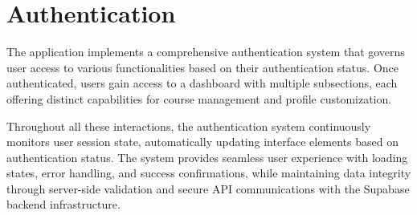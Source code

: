 \section{Authentication}

The application implements a comprehensive authentication system that governs user access to various functionalities based on their authentication status. Once authenticated, users gain access to a dashboard with multiple subsections, each offering distinct capabilities for course management and profile customization.











Throughout all these interactions, the authentication system continuously monitors user session state, automatically updating interface elements based on authentication status. The system provides seamless user experience with loading states, error handling, and success confirmations, while maintaining data integrity through server-side validation and secure API communications with the Supabase backend infrastructure.